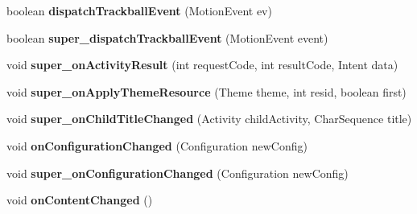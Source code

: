 \begin{DoxyCompactItemize}
boolean {\bfseries dispatch\+Trackball\+Event} (Motion\+Event ev)
\item 
\mbox{\label{classorg_1_1qtproject_1_1qt5_1_1android_1_1bindings_1_1_qt_activity_a84a82b3eb7dd352d126c55272c64264a}} 
boolean {\bfseries super\+\_\+dispatch\+Trackball\+Event} (Motion\+Event event)
\item 
\mbox{\label{classorg_1_1qtproject_1_1qt5_1_1android_1_1bindings_1_1_qt_activity_a03bf6f3f50c07592cbee97ce9ebdb315}} 
void {\bfseries super\+\_\+on\+Activity\+Result} (int request\+Code, int result\+Code, Intent data)
\item 
\mbox{\label{classorg_1_1qtproject_1_1qt5_1_1android_1_1bindings_1_1_qt_activity_a03b4db053b9528617c37bab2d47fc803}} 
void {\bfseries super\+\_\+on\+Apply\+Theme\+Resource} (Theme theme, int resid, boolean first)
\item 
\mbox{\label{classorg_1_1qtproject_1_1qt5_1_1android_1_1bindings_1_1_qt_activity_ac369eb38a2ea1f7a0d61c44a30d63620}} 
void {\bfseries super\+\_\+on\+Child\+Title\+Changed} (Activity child\+Activity, Char\+Sequence title)
\item 
\mbox{\label{classorg_1_1qtproject_1_1qt5_1_1android_1_1bindings_1_1_qt_activity_a75ef70261caa7d4db3041147dc46c5d0}} 
void {\bfseries on\+Configuration\+Changed} (Configuration new\+Config)
\item 
\mbox{\label{classorg_1_1qtproject_1_1qt5_1_1android_1_1bindings_1_1_qt_activity_a1c7f2e1b1ce16f2bfa70f38d88740565}} 
void {\bfseries super\+\_\+on\+Configuration\+Changed} (Configuration new\+Config)
\item 
\mbox{\label{classorg_1_1qtproject_1_1qt5_1_1android_1_1bindings_1_1_qt_activity_a6310ffd404267a66b52dd4c3b357b560}} 
void {\bfseries on\+Content\+Changed} ()

\end{DoxyCompactItemize}
